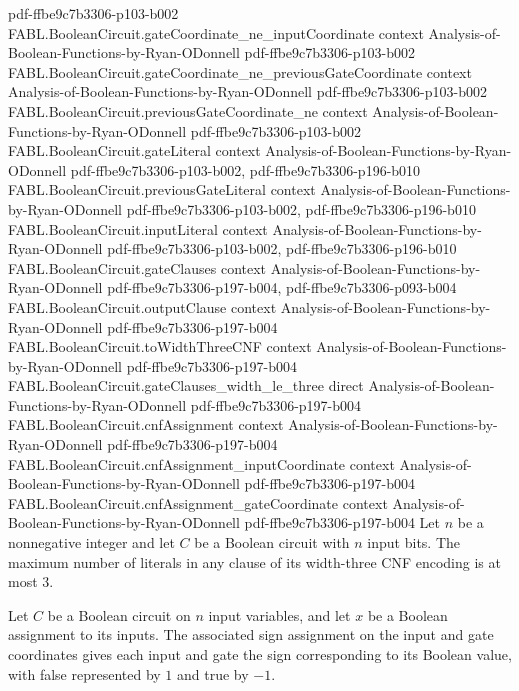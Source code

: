 \begin{theorem}
  {pdf-ffbe9c7b3306-p103-b002}
\proofstep
  {FABL.BooleanCircuit.gateCoordinate_ne_inputCoordinate}
  {context}
  {Analysis-of-Boolean-Functions-by-Ryan-ODonnell}
  {pdf-ffbe9c7b3306-p103-b002}
\proofstep
  {FABL.BooleanCircuit.gateCoordinate_ne_previousGateCoordinate}
  {context}
  {Analysis-of-Boolean-Functions-by-Ryan-ODonnell}
  {pdf-ffbe9c7b3306-p103-b002}
\proofstep
  {FABL.BooleanCircuit.previousGateCoordinate_ne}
  {context}
  {Analysis-of-Boolean-Functions-by-Ryan-ODonnell}
  {pdf-ffbe9c7b3306-p103-b002}
\proofstep
  {FABL.BooleanCircuit.gateLiteral}
  {context}
  {Analysis-of-Boolean-Functions-by-Ryan-ODonnell}
  {pdf-ffbe9c7b3306-p103-b002,
    pdf-ffbe9c7b3306-p196-b010}
\proofstep
  {FABL.BooleanCircuit.previousGateLiteral}
  {context}
  {Analysis-of-Boolean-Functions-by-Ryan-ODonnell}
  {pdf-ffbe9c7b3306-p103-b002,
    pdf-ffbe9c7b3306-p196-b010}
\proofstep
  {FABL.BooleanCircuit.inputLiteral}
  {context}
  {Analysis-of-Boolean-Functions-by-Ryan-ODonnell}
  {pdf-ffbe9c7b3306-p103-b002,
    pdf-ffbe9c7b3306-p196-b010}
\proofstep
  {FABL.BooleanCircuit.gateClauses}
  {context}
  {Analysis-of-Boolean-Functions-by-Ryan-ODonnell}
  {pdf-ffbe9c7b3306-p197-b004,
    pdf-ffbe9c7b3306-p093-b004}
\proofstep
  {FABL.BooleanCircuit.outputClause}
  {context}
  {Analysis-of-Boolean-Functions-by-Ryan-ODonnell}
  {pdf-ffbe9c7b3306-p197-b004}
\proofstep
  {FABL.BooleanCircuit.toWidthThreeCNF}
  {context}
  {Analysis-of-Boolean-Functions-by-Ryan-ODonnell}
  {pdf-ffbe9c7b3306-p197-b004}
\proofstep
  {FABL.BooleanCircuit.gateClauses_width_le_three}
  {direct}
  {Analysis-of-Boolean-Functions-by-Ryan-ODonnell}
  {pdf-ffbe9c7b3306-p197-b004}
\proofstep
  {FABL.BooleanCircuit.cnfAssignment}
  {context}
  {Analysis-of-Boolean-Functions-by-Ryan-ODonnell}
  {pdf-ffbe9c7b3306-p197-b004}
\proofstep
  {FABL.BooleanCircuit.cnfAssignment_inputCoordinate}
  {context}
  {Analysis-of-Boolean-Functions-by-Ryan-ODonnell}
  {pdf-ffbe9c7b3306-p197-b004}
\proofstep
  {FABL.BooleanCircuit.cnfAssignment_gateCoordinate}
  {context}
  {Analysis-of-Boolean-Functions-by-Ryan-ODonnell}
  {pdf-ffbe9c7b3306-p197-b004}
Let $n$ be a nonnegative integer and let $C$ be a Boolean circuit with $n$ input bits.
The maximum number of literals in any clause of its width-three CNF encoding is at most
$3$.
\end{theorem}

\begin{definition}
\label{FABL.BooleanCircuit.cnfAssignment}
\leanok
{}
Let $C$ be a Boolean circuit on $n$ input variables, and let $x$ be a Boolean assignment
to its inputs. The associated sign assignment on the input and gate coordinates gives
each input and gate the sign corresponding to its Boolean value, with false represented
by $1$ and true by $-1$.
\end{definition}

